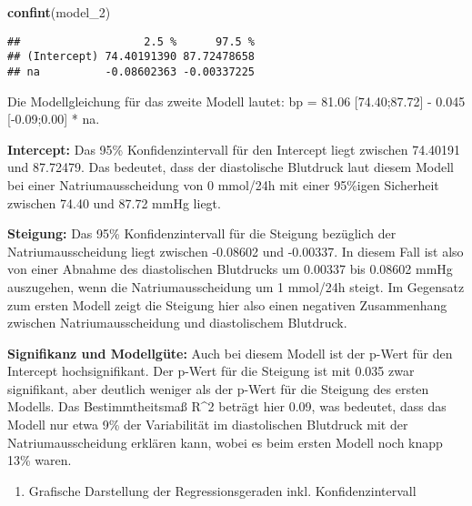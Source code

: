 \documentclass[
]{article}
\newenvironment{Shaded}{\begin{snugshade}}{\end{snugshade}}
\newcommand{\FunctionTok}[1]{\textcolor[rgb]{0.13,0.29,0.53}{\textbf{#1}}}
\newcommand{\NormalTok}[1]{#1}
\providecommand{\tightlist}{%
  \setlength{\itemsep}{0pt}\setlength{\parskip}{0pt}}
\begin{document}
\begin{Shaded}
\begin{Highlighting}[]
\FunctionTok{confint}\NormalTok{(model\_2)}
\end{Highlighting}
\end{Shaded}

\begin{verbatim}
##                   2.5 %      97.5 %
## (Intercept) 74.40191390 87.72478658
## na          -0.08602363 -0.00337225
\end{verbatim}

Die Modellgleichung für das zweite Modell lautet: bp = 81.06
{[}74.40;87.72{]} - 0.045 {[}-0.09;0.00{]} * na.

\textbf{Intercept:} Das 95\% Konfidenzintervall für den Intercept liegt
zwischen 74.40191 und 87.72479. Das bedeutet, dass der diastolische
Blutdruck laut diesem Modell bei einer Natriumausscheidung von 0
mmol/24h mit einer 95\%igen Sicherheit zwischen 74.40 und 87.72 mmHg
liegt.

\textbf{Steigung:} Das 95\% Konfidenzintervall für die Steigung
bezüglich der Natriumausscheidung liegt zwischen -0.08602 und -0.00337.
In diesem Fall ist also von einer Abnahme des diastolischen Blutdrucks
um 0.00337 bis 0.08602 mmHg auszugehen, wenn die Natriumausscheidung um
1 mmol/24h steigt. Im Gegensatz zum ersten Modell zeigt die Steigung
hier also einen negativen Zusammenhang zwischen Natriumausscheidung und
diastolischem Blutdruck.

\textbf{Signifikanz und Modellgüte:} Auch bei diesem Modell ist der
p-Wert für den Intercept hochsignifikant. Der p-Wert für die Steigung
ist mit 0.035 zwar signifikant, aber deutlich weniger als der p-Wert für
die Steigung des ersten Modells. Das Bestimmtheitsmaß R\^{}2 beträgt
hier 0.09, was bedeutet, dass das Modell nur etwa 9\% der Variabilität
im diastolischen Blutdruck mit der Natriumausscheidung erklären kann,
wobei es beim ersten Modell noch knapp 13\% waren.

\begin{enumerate}
\def\labelenumi{\roman{enumi})}
\tightlist
\item
  Grafische Darstellung der Regressionsgeraden inkl. Konfidenzintervall
\end{enumerate}
\end{document}
